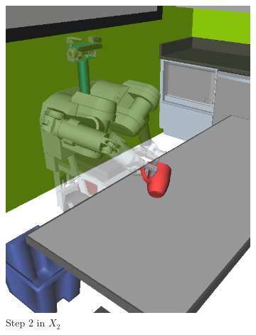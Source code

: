 {\begin{figure}
\begin{widepage}
\begin{center}
\begin{subfigure}[t]{0.19\linewidth}
\includegraphics[width=\columnwidth]{figs/testherb-c.png}
\caption{Step 2 in $X_2$}
\end{subfigure}
\begin{subfigure}[t]{0.19\linewidth}
\centering

\end{subfigure}
\end{center}
\end{widepage}
\end{figure}}
